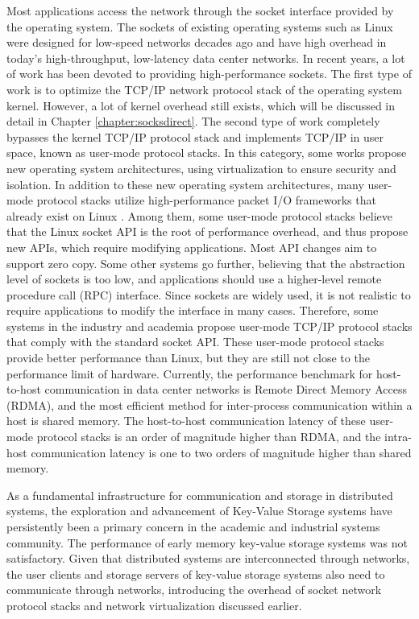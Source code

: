Most applications access the network through the socket interface provided by the operating system. The sockets of existing operating systems such as Linux were designed for low-speed networks decades ago and have high overhead in today's high-throughput, low-latency data center networks.
In recent years, a lot of work has been devoted to providing high-performance sockets.
The first type of work is to optimize the TCP/IP network protocol stack of the operating system kernel.
However, a lot of kernel overhead still exists, which will be discussed in detail in Chapter \ref {chapter:socksdirect}.
The second type of work completely bypasses the kernel TCP/IP protocol stack and implements TCP/IP in user space, known as user-mode protocol stacks.
In this category, some works \cite {belay2017ix,peter2016arrakis} propose new operating system architectures, using virtualization to ensure security and isolation.
In addition to these new operating system architectures, many user-mode protocol stacks utilize high-performance packet I/O frameworks that already exist on Linux \cite {rizzo2012netmap,dpdk,pf-ring}.
Among them, some user-mode protocol stacks \cite {marinos2014network,jeong2014mtcp,seastar,fstack} believe that the Linux socket API is the root of performance overhead, and thus propose new APIs, which require modifying applications.
Most API changes aim to support zero copy.
Some other systems \cite {kalia2016fasst,kalia2018datacenter} go further, believing that the abstraction level of sockets is too low, and applications should use a higher-level remote procedure call (RPC) interface.
Since sockets are widely used, it is not realistic to require applications to modify the interface in many cases.
Therefore, some systems in the industry \cite{libvma,openonload,dbl} and academia \cite{huang2017high} propose user-mode TCP/IP protocol stacks that comply with the standard socket API.
These user-mode protocol stacks provide better performance than Linux, but they are still not close to the performance limit of hardware.
Currently, the performance benchmark for host-to-host communication in data center networks is Remote Direct Memory Access (RDMA), and the most efficient method for inter-process communication within a host is shared memory.
The host-to-host communication latency of these user-mode protocol stacks is an order of magnitude higher than RDMA, and the intra-host communication latency is one to two orders of magnitude higher than shared memory.

As a fundamental infrastructure for communication and storage in distributed systems, the exploration and advancement of Key-Value Storage systems have persistently been a primary concern in the academic and industrial systems community. The performance of early memory key-value storage systems \cite{memcached} was not satisfactory. Given that distributed systems are interconnected through networks, the user clients and storage servers of key-value storage systems also need to communicate through networks, introducing the overhead of socket network protocol stacks and network virtualization discussed earlier. 

